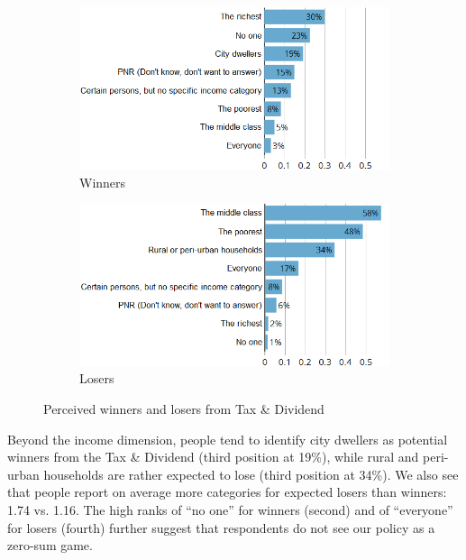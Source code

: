 \documentclass[english,5p,authoryear]{elsarticle}
\begin{document}
\begin{figure}[t]
\centering
\begin{subfigure}[b]{\columnwidth}
   \caption{Winners}
   \includegraphics[width=\columnwidth]{Images/tax_winners_synchro.png}
\end{subfigure}

\begin{subfigure}[b]{\columnwidth}
\vspace{0.3cm}
   \caption{Losers}
   \includegraphics[width=\columnwidth]{Images/tax_losers_synchro.png}
\end{subfigure}
\caption{Perceived winners and losers from Tax \& Dividend}
\label{fig:winners_losers}
\end{figure}

Beyond the income dimension, people tend to identify city dwellers as potential winners from the Tax \& Dividend (third position at 19\%), while rural and peri-urban households are rather expected to lose (third position at 34\%). We also see that people report on average more categories for expected losers than winners: 1.74 vs. 1.16. The high ranks of ``no one'' for winners (second) and of ``everyone'' for losers (fourth) further suggest that respondents do not see our policy as a zero-sum game. %
\end{document}
